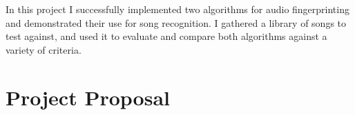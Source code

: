 \documentclass[12pt,a4paper,twoside,openright]{report}
\begin{document}
In this project I successfully implemented two algorithms for audio fingerprinting and demonstrated their use for song recognition. I gathered a library of songs to test against, and used it to evaluate and compare both algorithms against a variety of criteria.






\appendix


\chapter{Project Proposal}


\end{document}
